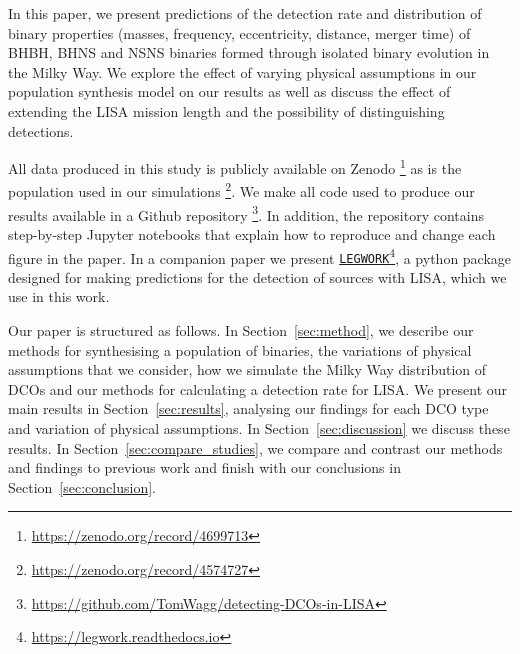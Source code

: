 In this paper, we present predictions of the detection rate and distribution of binary properties (masses, frequency, eccentricity, distance, merger time) of BHBH, BHNS and NSNS binaries formed through isolated binary evolution in the Milky Way. We explore the effect of varying physical assumptions in our population synthesis model on our results as well as discuss the effect of extending the LISA mission length and the possibility of distinguishing detections.

All data produced in this study is publicly available on Zenodo \href{https://zenodo.org/record/4699713}{\faFileCode}\footnote{\url{https://zenodo.org/record/4699713}} as is the population used in our simulations \href{https://zenodo.org/record/4574727}{\faFileCode}\footnote{\url{https://zenodo.org/record/4574727}}. We make all code used to produce our results available in a Github repository \href{https://github.com/TomWagg/detecting-DCOs-in-LISA}{\faGithub}\footnote{\url{https://github.com/TomWagg/detecting-DCOs-in-LISA}}. In addition, the repository contains step-by-step Jupyter notebooks that explain how to reproduce and change each figure in the paper. In a companion paper we present \href{https://legwork.readthedocs.io}{\texttt{LEGWORK}}\footnote{\url{https://legwork.readthedocs.io}}, a python package designed for making predictions for the detection of sources with LISA, which we use in this work.

Our paper is structured as follows. In Section~\ref{sec:method}, we describe our methods for synthesising a population of binaries, the variations of physical assumptions that we consider, how we simulate the Milky Way distribution of DCOs and our methods for calculating a detection rate for LISA. We present our main results in Section~\ref{sec:results}, analysing our findings for each DCO type and variation of physical assumptions. In Section~\ref{sec:discussion} we discuss these results. In Section~\ref{sec:compare_studies}, we compare and contrast our methods and findings to previous work and finish with our conclusions in Section~\ref{sec:conclusion}.